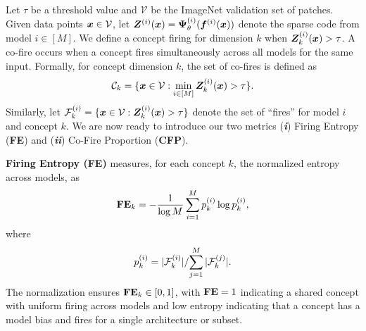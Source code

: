 Let $\tau$ be a threshold value and $\mathcal{V}$ be the ImageNet validation set of patches. Given data points $\bm{x} \in \mathcal{V}$, let $\bm{Z}^{(i)}(\bm{x}) = \bm{\Psi}_{\theta}^{(i)}(\bm{f}^{(i)}(\bm{x}))$ denote the sparse code from model $i \in [M]$. We define a concept firing for dimension $k$ when $\bm{Z}_k^{(i)}(\bm{x}) > \tau$. A co-fire occurs when a concept fires simultaneously across all models for the same input. Formally, for concept dimension $k$, the set of co-fires is defined as
\vspace{-1mm}
\begin{equation}
\mathcal{C}_k = \{\x \in \mathcal{V} : \min_{i \in [M]} \Z_k^{(i)}(\x) > \tau\}.
\vspace{-2mm}
\end{equation}
Similarly, let $\mathcal{F}^{(i)}_k = \{\bm{x} \in \mathcal{V} : \bm{Z}_k^{(i)}(\bm{x}) > \tau\}$ denote the set of ``fires'' for model $i$ and concept $k$. 
We are now ready to introduce our two metrics (\textbf{\textit{i}}) Firing Entropy (\textbf{FE}) and (\textbf{\textit{ii}}) Co-Fire Proportion (\textbf{CFP}). 

\vspace{-1mm}
\noindent\textbf{Firing Entropy ({FE})}  
measures, for each concept $k$, the normalized entropy across models, as
\vspace{-2mm}
\begin{equation}
\text{\textbf{FE}}_k = -\frac{1}{\log M}\sum_{i=1}^M p^{(i)}_k \log p^{(i)}_k,
\label{eq:cofire_metric_entropy}
\vspace{-1mm}
\end{equation}
where
\vspace{-2mm}
\begin{equation}
p^{(i)}_k = {|\mathcal{F}^{(i)}_k|}/{\sum_{j=1}^M |\mathcal{F}^{(j)}_k|}.
\label{eq:cofire_metric_probs}
\vspace{-1mm}
\end{equation}
The normalization ensures $\text{\textbf{FE}}_k \in [0,1]$, with $\textbf{FE} = 1$ indicating a shared concept with uniform firing across models and
low entropy indicating that a concept has a model bias and fires for a single architecture or subset. 

